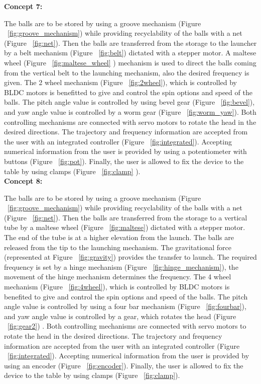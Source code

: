 \documentclass[12pt]{report}
\begin{document}
    \textbf{Concept 7:}

    The balls are to be stored by using a groove mechanism (Figure ~\ref{fig:groove_mechanism}) while providing recyclability of the balls with a net (Figure ~\ref{fig:net}). Then the balls are transferred from the storage to the launcher by a belt mechanism (Figure ~\ref{fig:belt}) dictated with a stepper motor. A maltese wheel (Figure ~\ref{fig:maltese_wheel} ) mechanism is used to direct the balls coming from the vertical belt to the launching mechanism, also the desired frequency is given. The 2 wheel mechanism (Figure ~\ref{fig:2wheel}), which is controlled by BLDC motors is benefitted to give and control the spin options and speed of the balls. The pitch angle value is controlled by using bevel gear (Figure ~\ref{fig:bevel}), and yaw angle value is controlled by a worm gear (Figure ~\ref{fig:worm_yaw}). Both controlling mechanisms are connected with servo motors to rotate the head in the desired directions. The trajectory and frequency information are accepted from the user with an integrated controller (Figure ~\ref{fig:integrated}). Accepting numerical information from the user is provided by using a potentiometer with buttons (Figure ~\ref{fig:pot}). Finally, the user is allowed to fix the device to the table by using clamps (Figure ~\ref{fig:clamp} ). \\



    \textbf{Concept 8:}

    The balls are to be stored by using a groove mechanism (Figure ~\ref{fig:groove_mechanism}) while providing recyclability of the balls with a net (Figure ~\ref{fig:net}). Then the balls are transferred from the storage to a vertical tube by a maltese wheel (Figure ~\ref{fig:maltese}) dictated with a stepper motor. The end of the tube is at a higher elevation from the launch. The balls are released from the tip to the launching mechanism. The gravitational force (represented at Figure ~\ref{fig:gravity}) provides the transfer to launch. The required frequency is set by a hinge mechanism (Figure ~\ref{fig:hinge_mechanism}), the movement of the hinge mechanism determines the frequency. The 4 wheel mechanism (Figure ~\ref{fig:4wheel}), which is controlled by BLDC motors is benefited to give and control the spin options and speed of the balls. The pitch angle value is controlled by using a four bar mechanism (Figure ~\ref{fig:fourbar}), and yaw angle value is controlled by a gear, which rotates the head (Figure ~\ref{fig:gear2}) . Both controlling mechanisms are connected with servo motors to rotate the head in the desired directions. The trajectory and frequency information are accepted from the user with an integrated controller (Figure ~\ref{fig:integrated}). Accepting numerical information from the user is provided by using an encoder (Figure ~\ref{fig:encoder}). Finally, the user is allowed to fix the device to the table by using clamps (Figure ~\ref{fig:clamp}). \\
  
\end{document}
